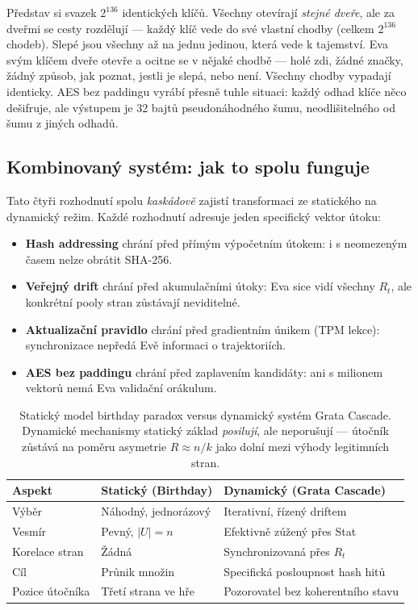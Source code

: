 \documentclass[11pt,a4paper]{article}
\begin{document}
\begin{aha}
Představ si svazek $2^{136}$ identických klíčů. Všechny otevírají \emph{stejné dveře}, ale za dveřmi se cesty rozdělují --- každý klíč vede do své vlastní chodby (celkem $2^{136}$ chodeb). Slepé jsou všechny až na jednu jedinou, která vede k tajemství. Eva svým klíčem dveře otevře a ocitne se v nějaké chodbě --- holé zdi, žádné značky, žádný způsob, jak poznat, jestli je slepá, nebo není. Všechny chodby vypadají identicky. AES bez paddingu vyrábí přesně tuhle situaci: každý odhad klíče něco dešifruje, ale výstupem je 32 bajtů pseudonáhodného šumu, neodlišitelného od šumu z jiných odhadů.
\end{aha}

\subsection{Kombinovaný systém: jak to spolu funguje}\label{pop:design-combined}

Tato čtyři rozhodnutí spolu \emph{kaskádově} zajistí transformaci ze statického na dynamický režim. Každé rozhodnutí adresuje jeden specifický vektor útoku:

\begin{itemize}[leftmargin=*]
\item \textbf{Hash addressing} chrání před přímým výpočetním útokem: i s neomezeným časem nelze obrátit SHA-256.
\item \textbf{Veřejný drift} chrání před akumulačními útoky: Eva sice vidí všechny $R_t$, ale konkrétní pooly stran zůstávají neviditelné.
\item \textbf{Aktualizační pravidlo} chrání před gradientním únikem (TPM lekce): synchronizace nepředá Evě informaci o trajektoriích.
\item \textbf{AES bez paddingu} chrání před zaplavením kandidáty: ani s milionem vektorů nemá Eva validační orákulum.
\end{itemize}

\begin{table}[ht]
\centering
\small
\begin{tabular}{lll}
\toprule
Aspekt & Statický (Birthday) & Dynamický (Grata Cascade) \\
\midrule
Výběr & Náhodný, jednorázový & Iterativní, řízený driftem \\
Vesmír & Pevný, $|U| = n$ & Efektivně zúžený přes Stat \\
Korelace stran & Žádná & Synchronizovaná přes $R_t$ \\
Cíl & Průnik množin & Specifická posloupnost hash hitů \\
Pozice útočníka & Třetí strana ve hře & Pozorovatel bez koherentního stavu \\
\bottomrule
\end{tabular}
\caption{Statický model birthday paradox versus dynamický systém Grata Cascade. Dynamické mechanismy statický základ \emph{posilují}, ale neporušují --- útočník zůstává na poměru asymetrie $R \approx n/k$ jako dolní mezi výhody legitimních stran.}
\label{tab:pop-static-vs-dynamic}
\end{table}
\end{document}
